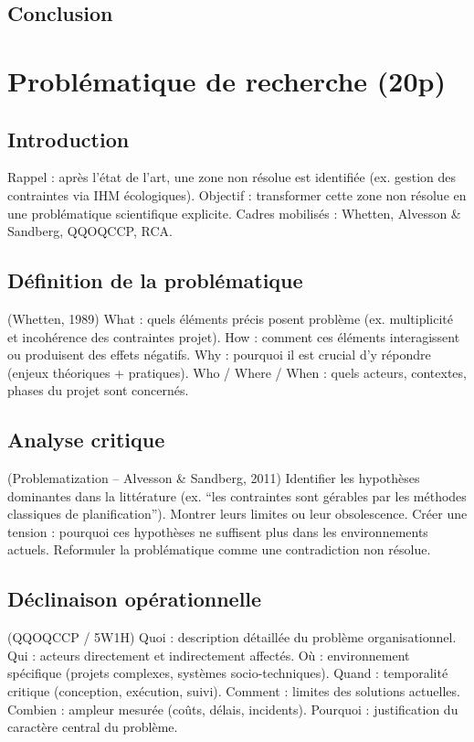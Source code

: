 \documentclass[a4paper,12pt]{article}
\begin{document}
\subsection{Conclusion}
\label{sec:orgabd6f01}
\clearpage
\section{Problématique de recherche (20p)}
\label{sec:orgb82d1b1}
\subsection{Introduction}
\label{sec:org1cd74bc}
Rappel : après l’état de l’art, une zone non résolue est identifiée (ex. gestion des contraintes via IHM écologiques).
Objectif : transformer cette zone non résolue en une problématique scientifique explicite.
Cadres mobilisés : Whetten, Alvesson \& Sandberg, QQOQCCP, RCA.
\subsection{Définition de la problématique}
\label{sec:org7aa0782}
(Whetten, 1989)
What : quels éléments précis posent problème (ex. multiplicité et incohérence des contraintes projet).
How : comment ces éléments interagissent ou produisent des effets négatifs.
Why : pourquoi il est crucial d’y répondre (enjeux théoriques + pratiques).
Who / Where / When : quels acteurs, contextes, phases du projet sont concernés.
\subsection{Analyse critique}
\label{sec:org634fe81}
(Problematization – Alvesson \& Sandberg, 2011)
Identifier les hypothèses dominantes dans la littérature (ex. “les contraintes sont gérables par les méthodes classiques de planification”).
Montrer leurs limites ou leur obsolescence.
Créer une tension : pourquoi ces hypothèses ne suffisent plus dans les environnements actuels.
Reformuler la problématique comme une contradiction non résolue.
\subsection{Déclinaison opérationnelle}
\label{sec:org6b8ea67}
(QQOQCCP / 5W1H)
Quoi : description détaillée du problème organisationnel.
Qui : acteurs directement et indirectement affectés.
Où : environnement spécifique (projets complexes, systèmes socio-techniques).
Quand : temporalité critique (conception, exécution, suivi).
Comment : limites des solutions actuelles.
Combien : ampleur mesurée (coûts, délais, incidents).
Pourquoi : justification du caractère central du problème.
\end{document}
